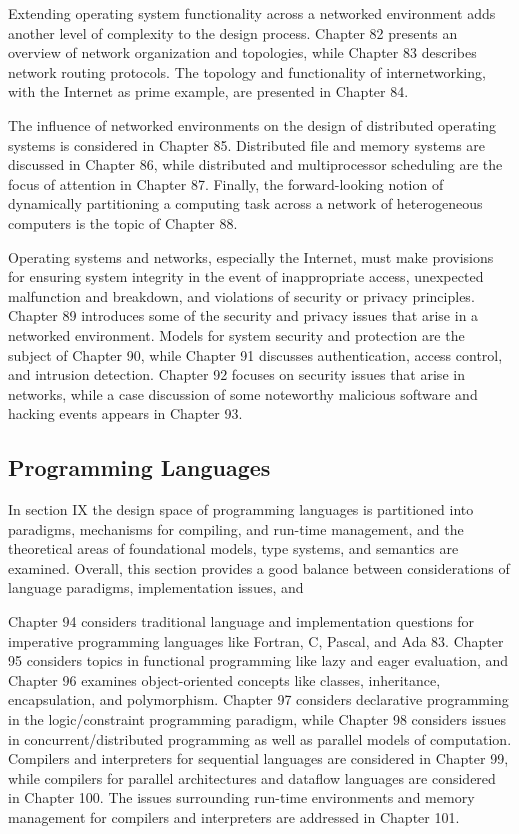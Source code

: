 Extending operating system functionality across a networked
environment adds another level of complexity to the design
process. Chapter 82 presents an overview of network
organization and topologies, while Chapter 83 describes network
routing protocols. The topology and functionality of
internetworking, with the Internet as prime example, are presented in
Chapter 84. 

The influence of networked environments on the design of
distributed operating systems is considered in Chapter 85.
Distributed file and memory systems are discussed in Chapter
86, while distributed and multiprocessor scheduling are the
focus of attention in Chapter 87. Finally, the forward-looking
notion of dynamically partitioning a computing task across a
network of heterogeneous computers is the topic of Chapter 88.

Operating systems and networks, especially the Internet, must make
provisions for ensuring system integrity in the event of
inappropriate access, unexpected malfunction and breakdown, and
violations of security or privacy principles. Chapter 89
introduces some of the security and privacy issues that arise in
a networked environment. Models for system security and
protection are the subject of Chapter 90, while Chapter 91
discusses authentication, access control, and intrusion
detection. Chapter 92 focuses on security issues that arise in
networks, while a case discussion of some noteworthy malicious
software and hacking events appears in Chapter 93.

\subsection{Programming Languages}

In section IX the design space of programming languages is partitioned
into paradigms, mechanisms for compiling, and run-time
management, and the theoretical areas of foundational models,
type systems, and semantics are examined. Overall, this section provides a
good balance between considerations of language paradigms,
implementation issues, and 

Chapter 94 considers traditional language and implementation
questions for imperative programming languages like Fortran, C,
Pascal, and Ada 83. Chapter 95 considers topics in functional
programming like lazy and eager evaluation, and Chapter 96
examines object-oriented concepts like classes, inheritance,
encapsulation, and polymorphism. Chapter 97 considers
declarative programming in the logic/constraint programming
paradigm, while Chapter 98 considers issues in
concurrent/distributed programming as well as parallel models of
computation. Compilers and interpreters for sequential languages
are considered in Chapter 99, while compilers for parallel
architectures and dataflow languages are considered in Chapter
100. The issues surrounding run-time environments and memory
management for compilers and interpreters are addressed in
Chapter 101.

